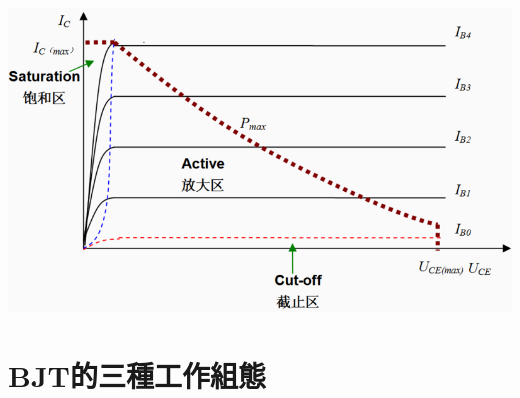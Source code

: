 \documentclass[
]{report}
\begin{document}
\includegraphics{BJT_work.png}

\hypertarget{bjtux7684ux4e09ux7a2eux5de5ux4f5cux7d44ux614b}{%
\section{BJT的三種工作組態}\label{bjtux7684ux4e09ux7a2eux5de5ux4f5cux7d44ux614b}}
\end{document}
